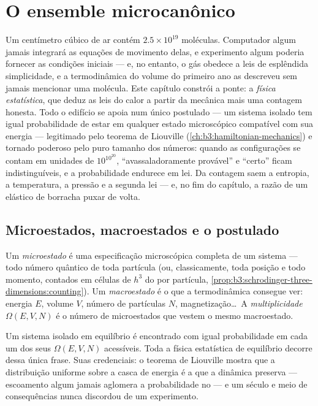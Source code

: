 \chapter{O ensemble microcanônico}\label{ch:b3:microcanonical-ensemble}

Um centímetro cúbico de ar contém $2.5\times10^{19}$ moléculas.
Computador algum jamais integrará as equações de movimento delas, e
experimento algum poderia fornecer as condições iniciais --- e, no
entanto, o gás obedece a leis de esplêndida simplicidade, e a
termodinâmica do volume do primeiro ano as descreveu sem jamais
mencionar uma molécula. Este capítulo constrói a ponte: a \emph{física
estatística}, que deduz as leis do calor a partir da mecânica mais uma
contagem honesta. Todo o edifício se apoia num único postulado --- um
sistema isolado tem igual probabilidade de estar em qualquer estado
microscópico compatível com sua energia --- legitimado pelo teorema de
Liouville (\cref{ch:b3:hamiltonian-mechanics}) e tornado poderoso pelo
puro tamanho dos números: quando as configurações se contam em unidades
de $10^{10^{20}}$, ``avassaladoramente provável'' e ``certo'' ficam
indistinguíveis, e a probabilidade endurece em lei. Da contagem saem a
entropia, a temperatura, a pressão e a segunda lei --- e, no fim do
capítulo, a razão de um elástico de borracha puxar de volta.

\section{Microestados, macroestados e o postulado}

\begin{definition}\label{def:b3:microcanonical-ensemble:states}
Um \emph{microestado} é uma especificação microscópica completa de um
sistema --- todo número quântico de toda partícula (ou, classicamente,
toda posição e todo momento, contados em células de $h^3$ do  por partícula,
\cref{prop:b3:schrodinger-three-dimensions:counting}).
Um \emph{macroestado} é o que a termodinâmica consegue ver: energia
$E$, volume $V$, número de partículas $N$, magnetização\dots\ A
\emph{multiplicidade} $\Omega(E, V, N)$ é o número de microestados que
vestem o mesmo macroestado.
\end{definition}

\begin{theorem}\label{thm:b3:microcanonical-ensemble:postulate}
Um sistema isolado em equilíbrio é encontrado com igual probabilidade
em cada um dos seus $\Omega(E, V, N)$  acessíveis. Toda a
física estatística de equilíbrio decorre dessa única frase. Suas
credenciais: o teorema de Liouville mostra que a distribuição uniforme
sobre a casca de energia é a que a dinâmica preserva --- escoamento
algum jamais aglomera a probabilidade no  --- e um
século e meio de consequências nunca discordou de um experimento.
\end{theorem}
\admitted

